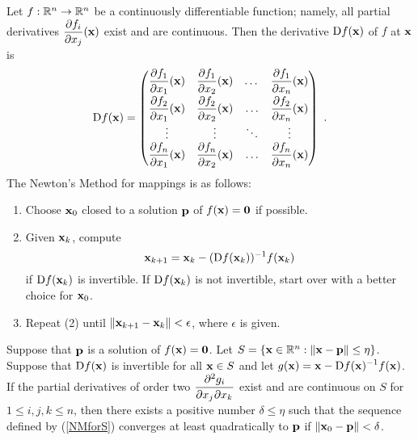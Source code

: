 Let $f:\RR^n \rightarrow \RR^n$ be a continuously differentiable
function; namely, all partial derivatives
$\displaystyle \pdydx{f_i}{x_j}(\VEC{x})$ exist and are continuous.
Then the derivative $\diff f(\VEC{x})$ of $f$ at $\VEC{x}$ is
\[
\diff f(\VEC{x}) = \begin{pmatrix}
\displaystyle \pdydx{f_1}{x_1}(\VEC{x}) &
\displaystyle \pdydx{f_1}{x_2}(\VEC{x}) & \dots &
\displaystyle \pdydx{f_1}{x_n}(\VEC{x}) \\[0.7em]
\displaystyle \pdydx{f_2}{x_1}(\VEC{x}) &
\displaystyle \pdydx{f_2}{x_2}(\VEC{x}) & \ldots &
\displaystyle \pdydx{f_2}{x_n}(\VEC{x}) \\
\vdots & \vdots & \ddots & \vdots \\
\displaystyle \pdydx{f_n}{x_1}(\VEC{x}) &
\displaystyle \pdydx{f_n}{x_2}(\VEC{x}) & \ldots &
\displaystyle \pdydx{f_n}{x_n}(\VEC{x})
\end{pmatrix} \ .
\]
The Newton's Method for mappings is as follows:

\begin{algo}
\begin{enumerate}
\item Choose $\VEC{x}_0$ closed to a solution $\VEC{p}$ of
$f(\VEC{x}) = \VEC{0}$ if possible.
\item Given $\VEC{x}_k$, compute
\begin{equation} \label{NMforS}
\VEC{x}_{k+1}=\VEC{x}_k- (\diff f(\VEC{x}_k))^{-1} f(\VEC{x}_k)
\end{equation}
if $\diff f(\VEC{x}_k)$ is invertible.  If $\diff f(\VEC{x}_k)$ is not
invertible, start over with a better choice for $\VEC{x}_0$.
\item  Repeat (2) until $\| \VEC{x}_{k+1} - \VEC{x}_k \| < \epsilon$,
where $\epsilon$ is given.
\end{enumerate}
\end{algo}

\begin{theorem}
Suppose that $\VEC{p}$ is a solution of $f(\VEC{x}) = \VEC{0}$.
Let $S=\{ \VEC{x} \in \RR^n : \| \VEC{x} - \VEC{p} \| \leq \eta\}$.
Suppose that $\diff f(\VEC{x})$ is invertible for all $\VEC{x} \in S$
and let
$\displaystyle g(\VEC{x}) = \VEC{x}- \diff f(\VEC{x})^{-1} f(\VEC{x})$.
If the partial derivatives of order two
$\displaystyle \pdydxnm{g_i}{x_j}{x_k}{2}{}{}$ exist and are
continuous on $S$ for $1 \leq i,j,k \leq n$, then
there exists a positive number $\delta \leq \eta$ such that the
sequence defined by (\ref{NMforS}) converges at least quadratically to
$\VEC{p}$ if $\| \VEC{x}_0 - \VEC{p} \| < \delta$.
\end{theorem}

